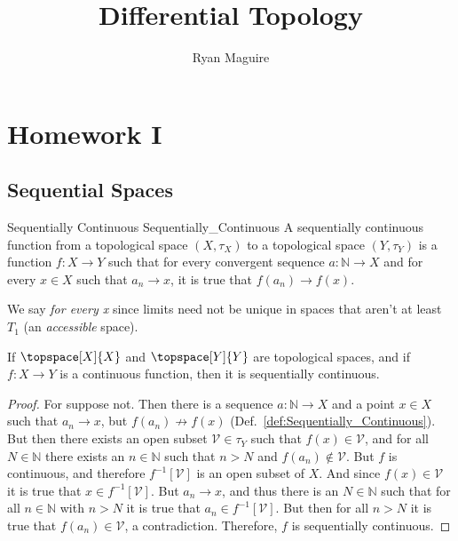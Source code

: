 \documentclass{article}                                                        %
\begin{document}
    \title{Differential Topology}
    \author{Ryan Maguire}
    \date{\vspace{-5ex}}
    \maketitle
    \tableofcontents
    \section{Homework I}
        \subsection{Sequential Spaces}
            \begin{fdefinition}{Sequentially Continuous}
                               {Sequentially_Continuous}
                A sequentially continuous function from a topological space
                $(X,\tau_{X})$ to a topological space $(Y,\tau_{Y})$ is a
                function $f:X\rightarrow{Y}$ such that for every convergent
                sequence $a:\mathbb{N}\rightarrow{X}$ and for every $x\in{X}$
                such that $a_{n}\rightarrow{x}$, it is true that
                $f(a_{n})\rightarrow{f}(x)$.
            \end{fdefinition}
            We say \textit{for every x} since limits need not be unique in
            spaces that aren't at least $T_{1}$ (an \textit{accessible} space).
            \begin{theorem}
                \label{thm:cont_implies_seq_cont}%
                If $\topspace[X]{X}$ and $\topspace[Y]{Y}$ are topological spaces,
                and if $f:X\rightarrow{Y}$ is a continuous function, then it is
                sequentially continuous.
            \end{theorem}
            \begin{proof}
                For suppose not. Then there is a sequence
                $a:\mathbb{N}\rightarrow{X}$ and a point $x\in{X}$ such that
                $a_{n}\rightarrow{x}$, but $f(a_{n})\not\rightarrow{f}(x)$
                (Def.~\ref{def:Sequentially_Continuous}). But then there exists
                an open subset $\mathcal{V}\in\tau_{Y}$ such that
                $f(x)\in\mathcal{V}$, and for all $N\in\mathbb{N}$ there exists
                an $n\in\mathbb{N}$ such that $n>N$ and
                $f(a_{n})\notin\mathcal{V}$. But $f$ is continuous, and
                therefore $f^{\minus{1}}[\mathcal{V}]$ is an open subset of $X$.
                And since $f(x)\in\mathcal{V}$ it is true that
                $x\in{f}^{\minus{1}}[\mathcal{V}]$. But $a_{n}\rightarrow{x}$,
                and thus there is an $N\in\mathbb{N}$ such that for all
                $n\in\mathbb{N}$ with $n>N$ it is true that
                $a_{n}\in{f}^{\minus{1}}[\mathcal{V}]$. But then for all $n>N$
                it is true that $f(a_{n})\in\mathcal{V}$, a contradiction.
                Therefore, $f$ is sequentially continuous.
            \end{proof}
\end{document}

